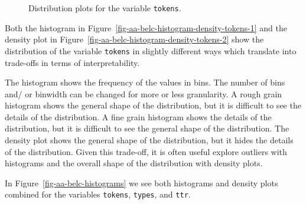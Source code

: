 \documentclass[
  letterpaper,
]{latex/krantz}
\theoremstyle{definition}
\theoremstyle{remark}
\begin{document}
\begin{figure}[H]
\begin{minipage}{0.50\linewidth}
{}


\end{minipage}%

\caption{\label{fig-aa-belc-histogram-density-tokens}Distribution plots
for the variable \texttt{tokens}.}

\end{figure}%

Both the histogram in
Figure~\ref{fig-aa-belc-histogram-density-tokens-1} and the density plot
in Figure~\ref{fig-aa-belc-histogram-density-tokens-2} show the
distribution of the variable \texttt{tokens} in slightly different ways
which translate into trade-offs in terms of interpretability.

The histogram shows the frequency of the values in bins. The number of
bins and/ or binwidth can be changed for more or less granularity. A
rough grain histogram shows the general shape of the distribution, but
it is difficult to see the details of the distribution. A fine grain
histogram shows the details of the distribution, but it is difficult to
see the general shape of the distribution. The density plot shows the
general shape of the distribution, but it hides the details of the
distribution. Given this trade-off, it is often useful explore outliers
with histograms and the overall shape of the distribution with density
plots.

In Figure~\ref{fig-aa-belc-histograms} we see both histograms and
density plots combined for the variables \texttt{tokens},
\texttt{types}, and \texttt{ttr}.
\end{document}
